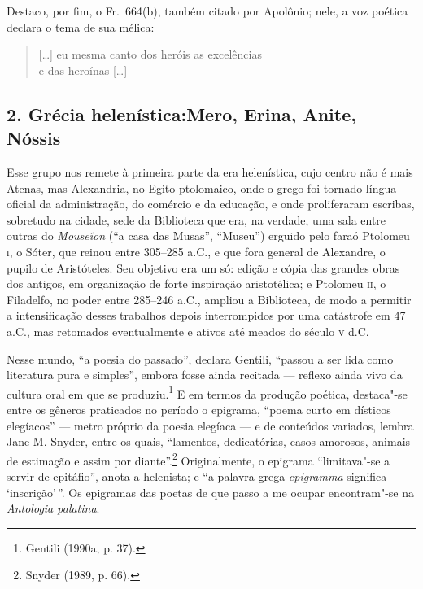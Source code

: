 Destaco, por fim, o Fr.~664(b), também citado por Apolônio; nele, a voz poética
declara o tema de sua mélica:

\begin{quote}
\mbox[\ldots{}] eu mesma canto dos heróis as excelências\\
e das heroínas [\ldots{}]
\end{quote}

\smallskip

\subsection*{2. Grécia helenística:\break Mero, Erina, Anite, Nóssis}

\smallskip

Esse grupo nos remete à primeira parte da era helenística, cujo centro não é
mais Atenas, mas Alexandria, no Egito ptolomaico, onde o grego foi tornado
língua oficial da administração, do comércio e da educação, e onde proliferaram
escribas, sobretudo na cidade, sede da Biblioteca que era, na
verdade, uma sala entre outras do \textit{Mouseîon} (“a casa das Musas”,
“Museu”) erguido pelo faraó Ptolomeu \textsc{i}, o Sóter, que reinou entre 305--285 a.C.,
e que fora general de Alexandre, o pupilo de Aristóteles. Seu objetivo era um
só: edição e cópia das grandes obras dos antigos, em organização de forte
inspiração aristotélica; e Ptolomeu \textsc{ii}, o Filadelfo, no poder entre 285--246
a.C., ampliou a Biblioteca, de modo a permitir a intensificação desses
trabalhos depois interrompidos por uma catástrofe em 47 a.C., mas retomados
eventualmente e ativos até meados do século \textsc{v} d.C. 

Nesse mundo, “a poesia do passado”, declara Gentili, “passou a
ser lida como literatura pura e simples”, embora fosse ainda recitada --- reflexo
ainda vivo da cultura oral em que se produziu.\footnote{ Gentili (1990a, p. 37).} E em termos da produção poética,
destaca"-se entre os gêneros praticados no período o epigrama, “poema curto em
dísticos elegíacos” --- metro próprio da poesia elegíaca --- e de conteúdos
variados, lembra Jane M. Snyder, entre os quais, “lamentos,
dedicatórias, casos amorosos, animais de estimação e assim por diante”.\footnote{ Snyder (1989, p. 66).}
Originalmente, o epigrama “limitava"-se a servir de epitáfio”, anota a
helenista; e “a palavra grega \textit{epigramma} significa ‘inscrição’\,”. Os
epigramas das poetas de que passo a me ocupar encontram"-se na \textit{Antologia
palatina}.

